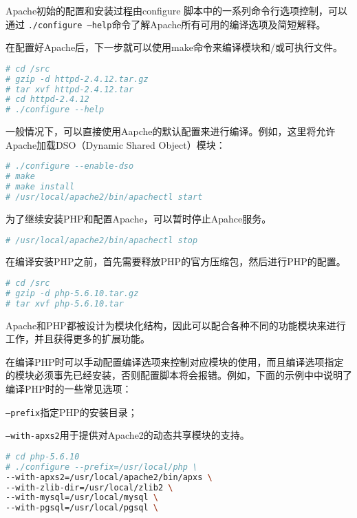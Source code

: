 Apache初始的配置和安装过程由configure 脚本中的一系列命令行选项控制，可以通过 \texttt{./configure --help}命令了解Apache所有可用的编译选项及简短解释。

在配置好Apache后，下一步就可以使用make命令来编译模块和/或可执行文件。


\begin{lstlisting}[language=bash]
# cd /src
# gzip -d httpd-2.4.12.tar.gz
# tar xvf httpd-2.4.12.tar
# cd httpd-2.4.12
# ./configure --help
\end{lstlisting}

一般情况下，可以直接使用Aapche的默认配置来进行编译。例如，这里将允许Apache加载DSO（Dynamic Shared Object）模块：


\begin{lstlisting}[language=bash]
# ./configure --enable-dso
# make
# make install
# /usr/local/apache2/bin/apachectl start
\end{lstlisting}


为了继续安装PHP和配置Apache，可以暂时停止Apahce服务。


\begin{lstlisting}[language=bash]
# /usr/local/apache2/bin/apachectl stop
\end{lstlisting}


在编译安装PHP之前，首先需要释放PHP的官方压缩包，然后进行PHP的配置。

\begin{lstlisting}[language=bash]
# cd /src
# gzip -d php-5.6.10.tar.gz
# tar xvf php-5.6.10.tar
\end{lstlisting}

Apache和PHP都被设计为模块化结构，因此可以配合各种不同的功能模块来进行工作，并且获得更多的扩展功能。

在编译PHP时可以手动配置编译选项来控制对应模块的使用，而且编译选项指定的模块必须事先已经安装，否则配置脚本将会报错。例如，下面的示例中中说明了编译PHP时的一些常见选项：

\begin{compactitem}
\item \texttt{--prefix}指定PHP的安装目录；
\item \texttt{--with-apxs2}用于提供对Apache2的动态共享模块的支持。
\end{compactitem}


\begin{lstlisting}[language=bash]
# cd php-5.6.10
# ./configure --prefix=/usr/local/php \
--with-apxs2=/usr/local/apache2/bin/apxs \
--with-zlib-dir=/usr/local/zlib2 \
--with-mysql=/usr/local/mysql \
--with-pgsql=/usr/local/pgsql \
\end{lstlisting}

